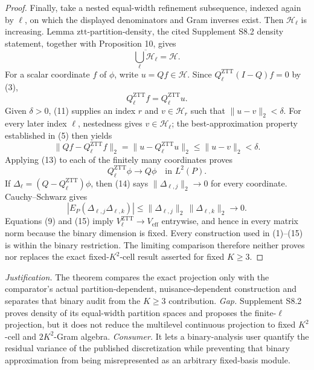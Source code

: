 \documentclass{article}
\begin{document}
\begin{proof}
Finally, take a nested equal-width refinement subsequence, indexed again by \(\ell\), on which the displayed denominators and Gram inverses exist.  Then \(\mathcal H_\ell\) is increasing.  Lemma \(\mathrm{ztt\mbox{-}partition\mbox{-}density}\), the cited Supplement S8.2 density statement, together with Proposition 10, gives
\[
\overline{\bigcup_\ell\mathcal H_\ell}=\mathcal H.                                        \tag{11}
\]
For a scalar coordinate \(f\) of \(\phi\), write \(u=Qf\in\mathcal H\).  Since \(Q_\ell^{\mathrm{ZTT}}(I-Q)f=0\) by (3),
\[
Q_\ell^{\mathrm{ZTT}}f=Q_\ell^{\mathrm{ZTT}}u.                                            \tag{12}
\]
Given \(\delta>0\), (11) supplies an index \(r\) and \(v\in\mathcal H_r\) such that \(\|u-v\|_2<\delta\).  For every later index \(\ell\), nestedness gives \(v\in\mathcal H_\ell\); the best-approximation property established in (5) then yields
\[
\|Qf-Q_\ell^{\mathrm{ZTT}}f\|_2
=\|u-Q_\ell^{\mathrm{ZTT}}u\|_2
\leq\|u-v\|_2<\delta.                                                                     \tag{13}
\]
Applying (13) to each of the finitely many coordinates proves
\[
Q_\ell^{\mathrm{ZTT}}\phi\longrightarrow Q\phi
\quad\text{in }L^2(P).                                                                      \tag{14}
\]
If \(\Delta_\ell=(Q-Q_\ell^{\mathrm{ZTT}})\phi\), then (14) says \(\|\Delta_{\ell,j}\|_2\to0\) for every coordinate.  Cauchy--Schwarz gives
\[
\left|E_P(\Delta_{\ell,j}\Delta_{\ell,k})\right|
\leq\|\Delta_{\ell,j}\|_2\,\|\Delta_{\ell,k}\|_2\longrightarrow0.                    \tag{15}
\]
Equations (9) and (15) imply \(V_\ell^{\mathrm{ZTT}}\to V_{\mathrm{eff}}\) entrywise, and hence in every matrix norm because the binary dimension is fixed.  Every construction used in (1)--(15) is within the binary restriction.  The limiting comparison therefore neither proves nor replaces the exact fixed-\(K^2\)-cell result asserted for fixed \(K\geq3\).
\end{proof}
\par\smallskip\noindent \textit{Justification.} The theorem compares the exact projection only with the comparator's actual partition-dependent, nuisance-dependent construction and separates that binary audit from the \(K\geq3\) contribution. \textit{Gap.} Supplement S8.2 proves density of its equal-width partition spaces and proposes the finite-\(\ell\) projection, but it does not reduce the multilevel continuous projection to fixed \(K^{2}\)-cell and \(2K^{2}\)-Gram algebra. \textit{Consumer.} It lets a binary-analysis user quantify the residual variance of the published discretization while preventing that binary approximation from being misrepresented as an arbitrary fixed-basis module.
\end{document}
